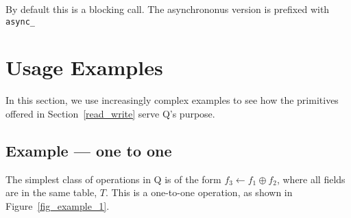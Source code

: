 By default this is a blocking call. The asynchrononus version is
prefixed with \verb+async_+

\section{Usage Examples}
In this section, we use increasingly complex examples to see how the
primitives offered in Section~\ref{read_write} serve Q's purpose.

\subsection{Example --- one to one}
\label{eg_one_to_one}
The simplest class of operations in Q is of the form \(f_3 \leftarrow
f_1 \oplus f_2\), where all fields are in the same table, \(T\). This is
a one-to-one operation, as shown in Figure~\ref{fig_example_1}.

\begin{figure}[hb]
\begin{center}
\end{center}
\end{figure}

